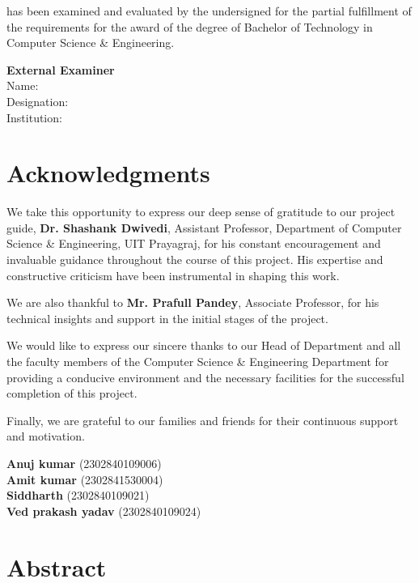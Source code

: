 \documentclass[12pt,a4paper]{report}
\begin{document}
has been examined and evaluated by the undersigned for the partial fulfillment of the requirements for the award of the degree of Bachelor of Technology in Computer Science \& Engineering.

\vspace{4cm}
\noindent \textbf{External Examiner} \\
Name: \hrulefill \\
Designation: \hrulefill \\
Institution: \hrulefill

\clearpage

\chapter*{\centering Acknowledgments}
\vspace{1cm}

We take this opportunity to express our deep sense of gratitude to our project guide, \textbf{Dr. Shashank Dwivedi}, Assistant Professor, Department of Computer Science \& Engineering, UIT Prayagraj, for his constant encouragement and invaluable guidance throughout the course of this project. His expertise and constructive criticism have been instrumental in shaping this work.

We are also thankful to \textbf{Mr. Prafull Pandey}, Associate Professor, for his technical insights and support in the initial stages of the project.

We would like to express our sincere thanks to our Head of Department and all the faculty members of the Computer Science \& Engineering Department for providing a conducive environment and the necessary facilities for the successful completion of this project.

Finally, we are grateful to our families and friends for their continuous support and motivation.

\vspace{1.5cm}
\begin{flushright}
\textbf{Anuj kumar} (2302840109006)\\
\textbf{Amit kumar} (2302841530004)\\
\textbf{Siddharth} (2302840109021)\\
\textbf{Ved prakash yadav} (2302840109024)
\end{flushright}

\clearpage

\chapter*{\centering Abstract}
\vspace{1cm}
\end{document}
